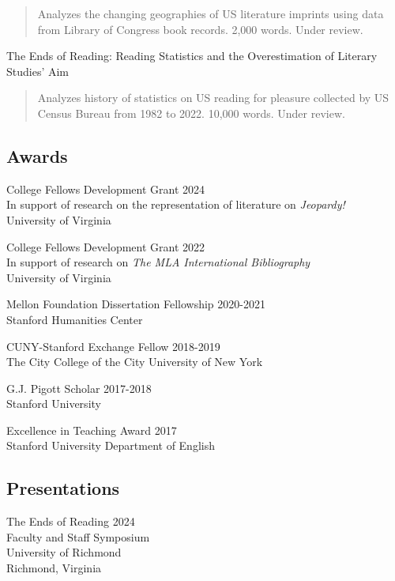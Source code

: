 \documentclass[
  12pt,
  letterpaper,
]{article}
\begin{document}
\begin{quote}
Analyzes the changing geographies of US literature imprints using data from Library of Congress book records. 2,000 words. Under review.
\end{quote}

The Ends of Reading: Reading Statistics and the Overestimation of Literary Studies' Aim

\begin{quote}
Analyzes history of statistics on US reading for pleasure collected by US Census Bureau from 1982 to 2022. 10,000 words. Under review.
\end{quote}

\hypertarget{awards}{%
\subsection{Awards}\label{awards}}

College Fellows Development Grant \hfill 2024\\
In support of research on the representation of literature on \emph{Jeopardy!}\\
University of Virginia

College Fellows Development Grant \hfill 2022\\
In support of research on \emph{The MLA International Bibliography}\\
University of Virginia

Mellon Foundation Dissertation Fellowship \hfill 2020-2021\\
Stanford Humanities Center

CUNY-Stanford Exchange Fellow \hfill 2018-2019\\
The City College of the City University of New York

G.J. Pigott Scholar \hfill 2017-2018\\
Stanford University

Excellence in Teaching Award \hfill 2017\\
Stanford University Department of English

\hypertarget{presentations}{%
\subsection{Presentations}\label{presentations}}

The Ends of Reading \hfill 2024\\
Faculty and Staff Symposium\\
University of Richmond\\
Richmond, Virginia
\end{document}

